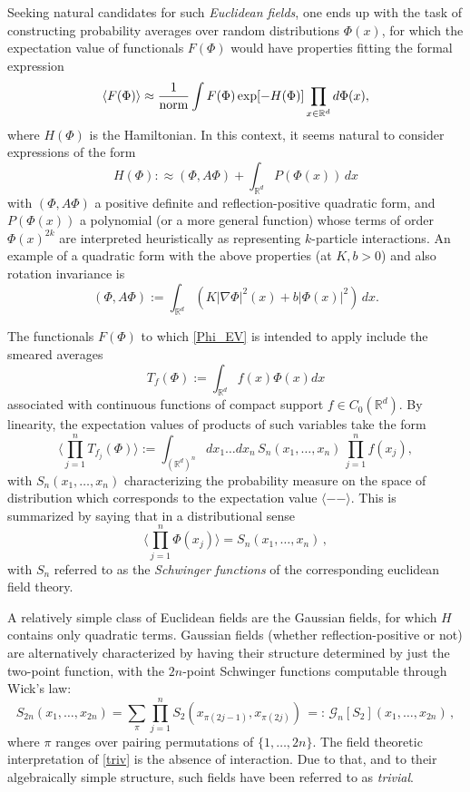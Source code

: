 \documentclass[a4paper,oneside,11pt]{article}
\def\R{\mathbb{R}}
\newcommand{\be}[1]{\begin{equation}\label{#1}}
\newcommand{\ee}{\end{equation}}
\numberwithin{equation}{section}
\numberwithin{equation}{section}
\numberwithin{equation}{section}
\def\be{\begin{equation}}
\def\ee{\end{equation}}
\begin{document}
Seeking natural candidates for such \emph{Euclidean fields}, one ends up with the task of constructing  probability averages over random distributions $\Phi(x)$, for which the expectation value of  functionals   $F(\Phi)$ would  have properties fitting the  formal expression  
\be \label{Phi_EV}
\langle F(\Phi) \rangle  \approx \frac1{\rm norm}   \int  F(\Phi) \exp[-H(\Phi)]  \prod_{x\in \R^d} d \Phi(x) ,
\ee 
where  
 $ H(\Phi) $ is the Hamiltonian. In this context, it seems natural to consider expressions of the form
  \be \label{eq:FI} 
H(\Phi):\approx  (\Phi, A  \Phi) + \int_{\R^d}   P(\Phi(x)  )  \, dx
\ee
with  $(\Phi, A  \Phi)$ a positive definite and reflection-positive quadratic form, and 
$P(\Phi(x)  )$ a polynomial (or a more general function) whose terms of  order $\Phi(x)^{2k}$ are interpreted heuristically as representing $k$-particle interactions.   An example of a quadratic form with the above properties  (at $K, b>0$) and also rotation invariance is  
\be \label{free_field}
  (\Phi, A  \Phi):=  \int_{\R^d}  \left( K \vert \nabla \Phi \vert^2(x) + b \vert \Phi(x) \vert^2 \right)   \, dx.
\ee

The functionals $F(\Phi)$ to which \eqref{Phi_EV} is intended to apply include  the smeared averages  
\be\label{eq:functional}
T_f(\Phi) :=   \int_{\R^d} f(x) \Phi(x) dx
\ee
 associated with continuous functions of compact support $f\in C_0(\R^d)$.    
By linearity, the expectation values of products of such variables take the form
\be \label{eq:Schwinger} 
\langle \prod_{j=1}^{n} T_{f_j}(\Phi) \rangle   :=   \int_{(\R^d)^n}  d x_1 \dots d x_n  \, S_n(x_1,\dots, x_n) \,\prod_{j=1}^n  f(x_j), 
\ee 
with  $S_n(x_1,\dots, x_n)$  characterizing the  probability measure on the space of distribution which corresponds to the expectation value $\langle  --  \rangle$.    This is summarized by saying that 
 in a distributional sense 
\be
\langle \prod_{j=1}^{n} \Phi(x_j) \rangle = S_n(x_1,\dots, x_n)    \, , 
\ee
with $S_n$ referred to as the {\em Schwinger functions} of the corresponding euclidean field theory.  

A relatively simple class of Euclidean fields are the Gaussian fields, for which  $H$ contains  only quadratic terms.   Gaussian fields (whether reflection-positive or not) are alternatively characterized by having their structure determined  by just  the two-point function, with  the $2n$-point Schwinger functions computable through  Wick's law:
\be \label{triv}
S_{2n}(x_1,\dots,x_{2n})  =  \sum_{\pi}  \prod_{j=1}^n S_2(x_{\pi(2j-1)},x_{\pi(2j)})\, =: \, \mathcal {G}_n[S_2](x_1,\dots,x_{2n}) \, ,
\ee 
where $\pi$ ranges over pairing permutations of $\{1,\dots,2n\}$.   
The field theoretic interpretation of \eqref{triv} is the absence of interaction.  Due to that, and to their algebraically simple structure, such fields have been referred to as {\em trivial}.  
\end{document}
